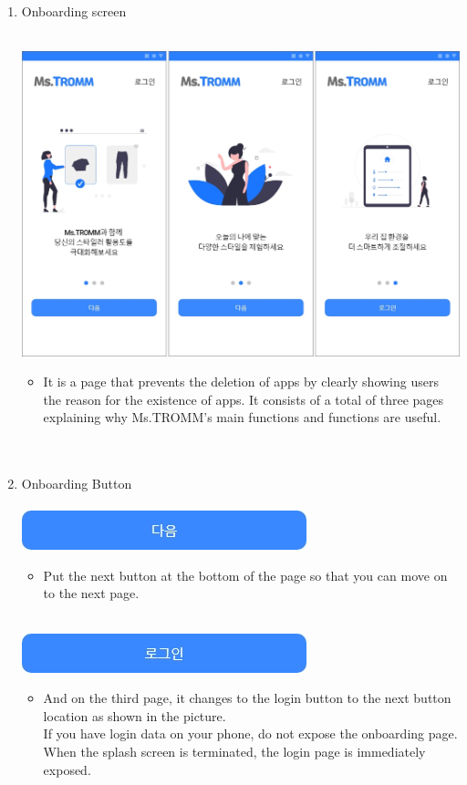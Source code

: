 \documentclass[conference]{IEEEtran}
\begin{document}
\begin{enumerate}
\break
    
    \item Onboarding screen \\ \\
    \centerline{\includegraphics[scale=0.25]{assets/온보딩.png}}
    \begin{itemize}
    \item[] It is a page that prevents the deletion of apps by clearly showing users the reason for the existence of apps. It consists of a total of three pages explaining why Ms.TROMM's main functions and functions are useful.\\ \\ \\
    \end{itemize}
    
    \item Onboarding Button \\ \\
    {\includegraphics[scale=0.75]{assets/온보딩_다음.jpg}}
    \begin{itemize}
    \item[] Put the next button at the bottom of the page so that you can move on to the next page. \\ \\ 
    \end{itemize}
    {\includegraphics[scale=0.75]{assets/온보딩_로그인.jpg}}
    \begin{itemize}
    \item[] And on the third page, it changes to the login button to the next button location as shown in the picture. 
    \\ If you have login data on your phone, do not expose the onboarding page. When the splash screen is terminated, the login page is immediately exposed.
    \end{itemize}
    \end{enumerate}
\end{document}
